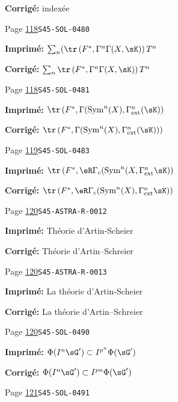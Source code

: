 \begin{description}
\par\noindent\textbf{Corrigé:} indexée
\smallskip
\item[\hypertarget{apparatus:FR-0075}{75}] Page \hyperlink{printpage:fr:118}{118}\quad\texttt{S45-SOL-0480}
\par\noindent\textbf{Imprimé:} \(\sum_n (\tr\left(F^*,\Gamma^n \Gamma(X,\sK)\right) T^n\)
\par\noindent\textbf{Corrigé:} \(\sum_n \tr\left(F^*,\Gamma^n \Gamma(X,\sK)\right) T^n\)
\smallskip
\item[\hypertarget{apparatus:FR-0076}{76}] Page \hyperlink{printpage:fr:118}{118}\quad\texttt{S45-SOL-0481}
\par\noindent\textbf{Imprimé:} \(\tr\left(F^*,\Gamma(\operatorname{Sym}^n(X),\Gamma_\text{ext}^n(\sK)\right)\)
\par\noindent\textbf{Corrigé:} \(\tr\left(F^*,\Gamma(\operatorname{Sym}^n(X),\Gamma_\text{ext}^n(\sK))\right)\)
\smallskip
\item[\hypertarget{apparatus:FR-0077}{77}] Page \hyperlink{printpage:fr:119}{119}\quad\texttt{S45-SOL-0483}
\par\noindent\textbf{Imprimé:} \(\tr\left(F^*,\eR\Gamma_c(\operatorname{Sym}^n(X,\Gamma_\text{ext}^n \sK)\right)\)
\par\noindent\textbf{Corrigé:} \(\tr\left(F^*,\eR\Gamma_c(\operatorname{Sym}^n(X),\Gamma_\text{ext}^n \sK)\right)\)
\smallskip
\item[\hypertarget{apparatus:FR-0078}{78}] Page \hyperlink{printpage:fr:120}{120}\quad\texttt{S45-ASTRA-R-0012}
\par\noindent\textbf{Imprimé:} Théorie d'Artin-Scheier
\par\noindent\textbf{Corrigé:} Théorie d'Artin--Schreier
\smallskip
\item[\hypertarget{apparatus:FR-0079}{79}] Page \hyperlink{printpage:fr:120}{120}\quad\texttt{S45-ASTRA-R-0013}
\par\noindent\textbf{Imprimé:} La théorie d'Artin-Scheier
\par\noindent\textbf{Corrigé:} La théorie d'Artin--Schreier
\smallskip
\item[\hypertarget{apparatus:FR-0080}{80}] Page \hyperlink{printpage:fr:120}{120}\quad\texttt{S45-SOL-0490}
\par\noindent\textbf{Imprimé:} \(\Phi(I^n \sG')\subset I^{p^n}\Phi(\sG')\)
\par\noindent\textbf{Corrigé:} \(\Phi(I^n \sG')\subset I^{p n}\Phi(\sG')\)
\smallskip
\item[\hypertarget{apparatus:FR-0081}{81}] Page \hyperlink{printpage:fr:121}{121}\quad\texttt{S45-SOL-0491}

\end{description}
